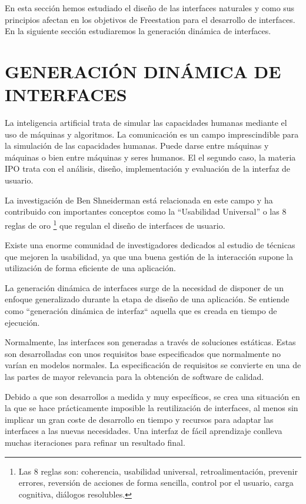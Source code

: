 En esta sección hemos estudiado el diseño de las interfaces naturales y como
sus principios afectan en los objetivos de Freestation para el desarrollo de
interfaces. En la siguiente sección estudiaremos la generación dinámica de
interfaces.

\section{\uppercase{Generación dinámica de interfaces}}
\label{sec:generacionint}
La inteligencia artificial trata de simular las capacidades humanas mediante
el uso de máquinas y algoritmos. La comunicación es un campo imprescindible para
la simulación de las capacidades humanas. Puede darse entre máquinas
y máquinas o bien entre máquinas y seres humanos. El el segundo caso, la materia
\acs{IPO}\label{acro:IPO} trata con el análisis, diseño, implementación y 
evaluación de la interfaz de usuario\cite{LoM99}.

La investigación de Ben Shneiderman\cite{Shn09} está relacionada en este campo y
ha contribuido con importantes conceptos como 
la ``Usabilidad Universal'' o las 8 reglas de oro \footnote{Las 8 reglas 
son: coherencia, usabilidad universal, retroalimentación, prevenir
errores, reversión de acciones de forma sencilla, control por el usuario,
carga cognitiva, diálogos resolubles.}
    \label{ftn:8rules} que regulan el diseño de
interfaces de usuario. 

Existe una enorme comunidad de investigadores dedicados al estudio de técnicas que 
mejoren la usabilidad\cite{Shn89}, ya que una buena gestión de la interacción
supone la utilización de forma eficiente de una aplicación.

La generación dinámica de interfaces surge de la necesidad de disponer de
un enfoque generalizado durante la etapa de diseño de una
aplicación\cite{Bar09}. Se entiende como ``generación dinámica de interfaz``
aquella que es creada en tiempo de ejecución.

\newpage

Normalmente, las interfaces son generadas a través de soluciones estáticas.
Estas son desarrolladas con unos requisitos base especificados que normalmente
no varían en modelos normales. La especificación de requisitos se convierte en
una de las partes de mayor relevancia para la obtención de software de calidad.

Debido a que son desarrollos a medida y muy específicos, se crea una situación
en la que se hace prácticamente imposible la reutilización de
interfaces\cite{Fis00}, al menos sin implicar un gran coste de desarrollo en tiempo y recursos para
adaptar las interfaces a las nuevas necesidades. Una interfaz de fácil
aprendizaje conlleva muchas iteraciones para refinar un resultado final.

